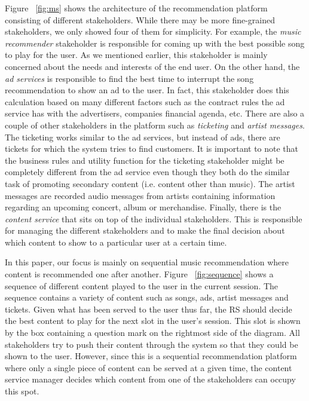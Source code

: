 Figure ~\ref{fig:ms} shows the architecture of the recommendation platform consisting of different stakeholders. While there may be more fine-grained stakeholders, we only showed four of them for simplicity. For example, the \textit{music recommender} stakeholder is responsible for coming up with the best possible song to play for the user. As we mentioned earlier, this stakeholder is mainly concerned about the needs and interests of the end user. On the other hand, the \textit{ad services} is responsible to find the best time to interrupt the song recommendation to show an ad to the user. In fact, this stakeholder does this calculation based on many different factors such as the contract rules the ad service has with the advertisers, companies financial agenda, etc. There are also a couple of other stakeholders in the platform such as \textit{ticketing} and \textit{artist messages}. The ticketing works similar to the ad services, but instead of ads, there are tickets for which the system tries to find customers. It is important to note that the business rules and utility function for the ticketing stakeholder might be completely different from the ad service even though they both do the similar task of promoting secondary content (i.e. content other than music). The artist messages are recorded audio messages from artists containing information regarding an upcoming concert, album or merchandise. Finally, there is the \textit{content service} that sits on top of the individual stakeholders. This is responsible for managing the different stakeholders and to make the final decision about which content to show to a particular user at a certain time.

In this paper, our focus is mainly on sequential music recommendation where content is recommended one after another. Figure ~\ref{fig:sequence} shows a sequence of different content played to the user in the current session. The sequence contains a variety of content such as songs, ads, artist messages and tickets. Given what has been served to the user thus far, the RS should decide the best content to play for the next slot in the user's session. This slot is shown by the box containing a question mark on the rightmost side of the diagram. All stakeholders try to push their content through the system so that they could be shown to the user. However, since this is a sequential recommendation platform where only a single piece of content can be served at a given time, the content service manager decides which content from one of the stakeholders can occupy this spot.

